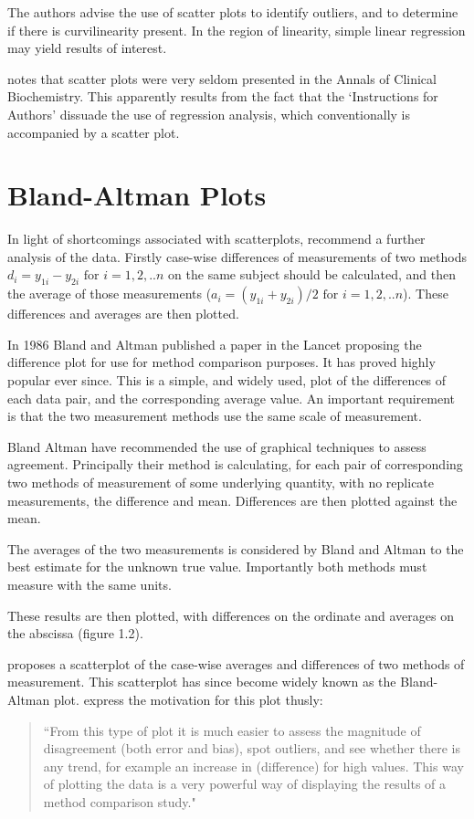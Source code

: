 \documentclass[Main.tex]{subfiles}
\begin{document}
The authors advise the use of scatter plots to identify outliers, and to determine if there is curvilinearity present. In the region of linearity, simple linear regression may yield results of interest.

\citet{Dewitte} notes that scatter plots were very seldom presented in the Annals of Clinical Biochemistry. This apparently results from the fact that the `Instructions for Authors' dissuade the use of regression analysis, which conventionally is accompanied by a scatter plot.



\section{Bland-Altman Plots}




In light of shortcomings associated with scatterplots, \citet*{BA83} recommend a further analysis of the data. Firstly
case-wise differences of measurements of two methods $d_{i} = y_{1i}-y_{2i} \mbox{ for }i=1,2,..n$ on the same subject should be calculated, and then the average of those measurements ($a_{i} = (y_{1i} + y_{2i})/2 \mbox{ for }i=1,2,..n$). These differences and
averages are then plotted. 

In 1986 Bland and Altman published a paper in the Lancet proposing the difference plot for use for method comparison purposes. It has
proved highly popular ever since. This is a simple, and widely used, plot of the differences of each data pair, and the corresponding average value. An important requirement is that the two measurement methods use the same scale of measurement.

Bland Altman have recommended the use of graphical techniques to assess agreement.
Principally their method is calculating, for each pair of corresponding two methods of measurement of some underlying quantity, with no replicate measurements, the difference and mean. Differences are then plotted against the mean.

The averages of the two measurements is considered by
	Bland and Altman to the best estimate for the unknown true value.
	Importantly both methods must measure with the same units. 
	
	These
	results are then plotted, with differences on the ordinate and
	averages on the abscissa (figure 1.2).



\citet{BA83} proposes a scatterplot of the case-wise averages and differences of two methods of measurement. This scatterplot has since become widely known as the Bland-Altman plot. \citet*{BA83} express the
motivation for this plot thusly:
\begin{quote}
	``From this type of plot it is much easier to assess the magnitude
	of disagreement (both error and bias), spot outliers, and see
	whether there is any trend, for example an increase in (difference) for high values. This way of plotting the data is a very powerful way of displaying the results of a method comparison study."
\end{quote}
\end{document}
